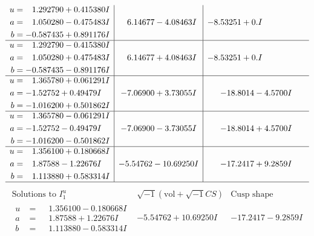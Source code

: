 \documentclass[1p]{elsarticle_modified}
\theoremstyle{definition}
\newcommand{\I}{\sqrt{-1}}
\begin{document}
$$\begin{array}{c|c|c}
\begin{aligned}
u &= \phantom{-}1.292790 + 0.415380 I \\
a &= \phantom{-}1.050280 - 0.475483 I \\
b &= -0.587435 + 0.891176 I\end{aligned}
 & \phantom{-}6.14677 - 4.08463 I & -8.53251 + 0. I\phantom{ +0.000000I} \\ \hline\begin{aligned}
u &= \phantom{-}1.292790 - 0.415380 I \\
a &= \phantom{-}1.050280 + 0.475483 I \\
b &= -0.587435 - 0.891176 I\end{aligned}
 & \phantom{-}6.14677 + 4.08463 I & -8.53251 + 0. I\phantom{ +0.000000I} \\ \hline\begin{aligned}
u &= \phantom{-}1.365780 + 0.061291 I \\
a &= -1.52752 + 0.49479 I \\
b &= -1.016200 + 0.501862 I\end{aligned}
 & -7.06900 + 3.73055 I & -18.8014 - 4.5700 I \\ \hline\begin{aligned}
u &= \phantom{-}1.365780 - 0.061291 I \\
a &= -1.52752 - 0.49479 I \\
b &= -1.016200 - 0.501862 I\end{aligned}
 & -7.06900 - 3.73055 I & -18.8014 + 4.5700 I \\ \hline\begin{aligned}
u &= \phantom{-}1.356100 + 0.180668 I \\
a &= \phantom{-}1.87588 - 1.22676 I \\
b &= \phantom{-}1.113880 + 0.583314 I\end{aligned}
 & -5.54762 - 10.69250 I & -17.2417 + 9.2859 I\\
 \hline 
 \end{array}$$\newpage$$\begin{array}{c|c|c}  
\text{Solutions to }I^u_{1}& \I (\text{vol} + \sqrt{-1}CS) & \text{Cusp shape}\\
 \hline 
\begin{aligned}
u &= \phantom{-}1.356100 - 0.180668 I \\
a &= \phantom{-}1.87588 + 1.22676 I \\
b &= \phantom{-}1.113880 - 0.583314 I\end{aligned}
 & -5.54762 + 10.69250 I & -17.2417 - 9.2859 I \\ \hline\begin{aligned}

\end{aligned}
\end{array}$$
\end{document}
